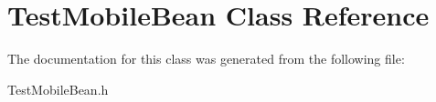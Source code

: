 \hypertarget{interface_test_mobile_bean}{
\section{\-Test\-Mobile\-Bean \-Class \-Reference}
\label{interface_test_mobile_bean}
}


\-The documentation for this class was generated from the following file\-:\begin{DoxyCompactItemize}
\item 
\-Test\-Mobile\-Bean.\-h\end{DoxyCompactItemize}
